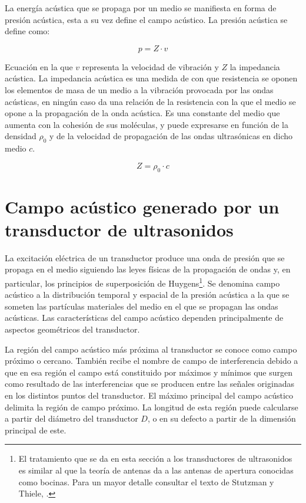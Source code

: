La energía acústica que se propaga por un medio se manifiesta en forma de
presión acústica, esta a su vez define el campo acústico. La presión
acústica se define como:

\begin{equation}
	p = Z\cdot v
	\label{eq:acuospressure}
\end{equation}

Ecuación en la que $v$ representa la velocidad de vibración y $Z$ la
impedancia acústica. La impedancia acústica es una medida de con que
resistencia se oponen los elementos de masa de un medio a la vibración
provocada por las ondas acústicas, en ningún caso da una relación de la
resistencia con la que el medio se opone a la propagación de la onda
acústica. Es una constante del medio que aumenta con la cohesión de sus
moléculas, y puede expresarse en función de la densidad $\rho_0$ y de la
velocidad de propagación de las ondas ultrasónicas en dicho medio $c$.

\begin{equation}
	Z = \rho_0\cdot c
	\label{eq:Zacoustic}
\end{equation}


\section[Campo acústico generado por un transductor]{Campo acústico
generado por un transductor de ultrasonidos}\label{sec:field}

La excitación eléctrica de un transductor produce una onda de presión que
se propaga en el medio siguiendo las leyes físicas de la propagación de
ondas y, en particular, los principios de superposición de
Huygens\footnote{El tratamiento que se da en esta sección a los
transductores de ultrasonidos es similar al que la teoría de antenas da a
las antenas de apertura conocidas como bocinas. Para un mayor detalle
consultar el texto de Stutzman y Thiele, \cite{stutzman1997atd}.}. Se
denomina campo acústico a la distribución temporal y espacial de la presión
acústica a la que se someten las partículas materiales del medio en el que
se propagan las ondas acústicas. Las características del campo acústico
dependen principalmente de aspectos geométricos del transductor.

La región del campo acústico más próxima al transductor se conoce como
campo próximo o cercano. También recibe el nombre de campo de interferencia
debido a que en esa región el campo está constituido por máximos y mínimos
que surgen como resultado de las interferencias que se producen entre las
señales originadas en los distintos puntos del transductor. El máximo
principal del campo acústico delimita la región de campo próximo. La
longitud de esta región puede calcularse a partir del diámetro del
transductor $D$, o en su defecto a partir de la dimensión principal de
este.

